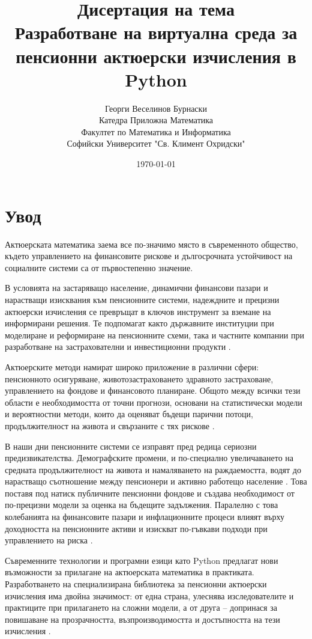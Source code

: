 \documentclass[a4paper,12pt]{article}
\title{\textbf{Дисертация на тема
        \\[0.5em] \large{Разработване на виртуална среда за пенсионни актюерски изчисления в Python}}}
\author{Георги Веселинов Бурнаски
        \\ Катедра Приложна Математика
        \\ Факултет по Математика и Информатика
        \\ Софийски Университет "Св. Климент Охридски"}
\date{\today}
\begin{document}
\maketitle
\newpage
\section{Увод}
Актюерската математика заема все по-значимо място в съвременното общество, където управлението на финансовите рискове и дългосрочната устойчивост на социалните системи са от първостепенно значение.

В условията на застаряващо население, динамични финансови пазари и нарастващи изисквания към пенсионните системи, надеждните и прецизни актюерски изчисления се превръщат в ключов инструмент за вземане на информирани решения. Те подпомагат както държавните институции при моделиране и реформиране на пенсионните схеми, така и частните компании при разработване на застрахователни и инвестиционни продукти \cite{dalriada2023}.

Актюерските методи намират широко приложение в различни сфери:
пенсионното осигуряване, животозастраховането здравното застраховане, управлението на фондове и финансовото планиране. Общото между всички тези области е необходимостта от точни прогнози, основани на статистически модели и вероятностни методи, които да оценяват бъдещи парични потоци, продължителност на живота и свързаните с тях рискове \cite{milliman2022}.

В наши дни пенсионните системи се изправят пред редица сериозни предизвикателства. Демографските промени, и по-специално увеличаването на средната продължителност на живота и намаляването на раждаемостта, водят до нарастващо съотношение между пенсионери и
активно работещо население \cite{bostonfed1999}. Това поставя под натиск публичните пенсионни фондове и създава необходимост от по-прецизни модели за оценка на бъдещите задължения. Паралелно с това колебанията на финансовите пазари и инфлационните процеси влияят върху доходността на пенсионните активи и изискват по-гъвкави подходи при управлението на риска \cite{ncpers2023}.

Съвременните технологии и програмни езици като Python предлагат нови възможности за прилагане на актюерската математика в практиката. Разработването на специализирана библиотека за пенсионни актюерски изчисления има двойна значимост: от една страна, улеснява изследователите и практиците при прилагането на сложни модели, а от друга – допринася за повишаване на прозрачността, възпроизводимостта и достъпността на тези изчисления \cite{lifelib2024, hyperexponential2023}.
\end{document}
